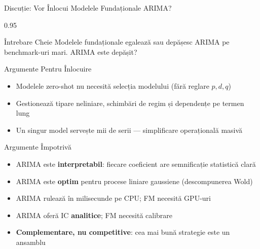 \documentclass[9pt, aspectratio=169, t]{beamer}
\begin{document}
\begin{frame}{Discuție: Vor Înlocui Modelele Fundaționale ARIMA?}
    \begin{cminipage}{0.95\textwidth}
    {\scriptsize
    \begin{alertblock}{Întrebare Cheie}
        Modelele fundaționale egalează sau depășesc ARIMA pe benchmark-uri mari. ARIMA este depășit?
    \end{alertblock}
    \begin{block}{Argumente Pentru Înlocuire}
        \begin{itemize}\setlength{\itemsep}{0pt}
            \item Modelele zero-shot nu necesită selecția modelului (fără reglare $p,d,q$)
            \item Gestionează tipare neliniare, schimbări de regim și dependențe pe termen lung
            \item Un singur model servește mii de serii --- simplificare operațională masivă
        \end{itemize}
    \end{block}
    \begin{exampleblock}{Argumente Împotrivă}
        \begin{itemize}\setlength{\itemsep}{0pt}
            \item ARIMA este \textbf{interpretabil}: fiecare coeficient are semnificație statistică clară
            \item ARIMA este \textbf{optim} pentru procese liniare gaussiene (descompunerea Wold)
            \item ARIMA rulează în milisecunde pe CPU; FM necesită GPU-uri
            \item ARIMA oferă IC \textbf{analitice}; FM necesită calibrare
            \item \textbf{Complementare, nu competitive}: cea mai bună strategie este un ansamblu
        \end{itemize}
    \end{exampleblock}
    }
    \end{cminipage}
\end{frame}
\end{document}
